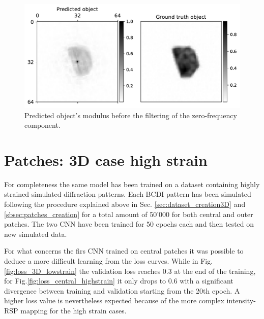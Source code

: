 \begin{figure}[H]
    \centering
    \includegraphics[width=\textwidth]{figures/Phasing/stitching_filtering.pdf}
    \caption{Predicted object's modulus before the filtering of the zero-frequency component.}
    \label{fig:stitching_filtering}
\end{figure}


\section{Patches: 3D case high strain}\label{chp:patches_strain}

For completeness the same model has been trained on a dataset containing highly strained simulated diffraction patterns. 
Each BCDI pattern has been simulated following the procedure explained above in Sec. \ref{sec:dataset_creation3D} and
 \ref{sbsec:patches_creation} for a total amount of 50'000 for both central and outer patches. The two CNN have been trained 
 for 50 epochs each and then tested on new simulated data. 

 For what concerns the firs CNN trained on central patches it was possible to deduce a more difficult learning from the 
 loss curves. While in Fig.\ref{fig:loss_3D_lowstrain} the validation loss reaches 0.3 at the end of the training, for 
Fig.\ref{fig:loss_central_highstrain} it only drops to 0.6 with a significant divergence between training and validation 
starting from the 20th epoch. A higher loss value is nevertheless expected because of the more complex intensity-RSP mapping 
for the high strain cases. 

